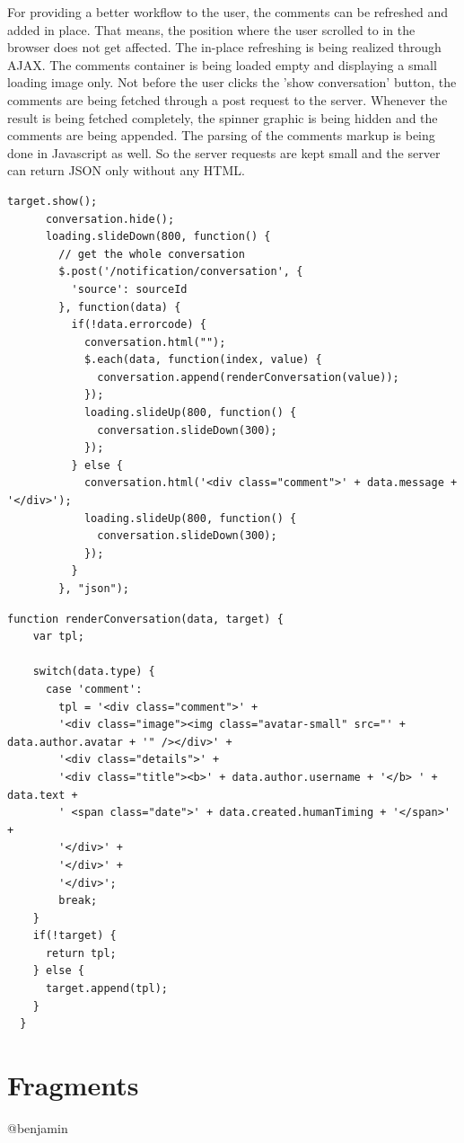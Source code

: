 For providing a better workflow to the user, the comments can be refreshed and added in place. That means, the position where the user scrolled to in the browser does not get affected. The in-place refreshing is being realized through AJAX. The comments container is being loaded empty and displaying a small loading image only. Not before the user clicks the 'show conversation' button, the comments are being fetched through a post request to the server. Whenever the result is being fetched completely, the spinner graphic is being hidden and the comments are being appended. The parsing of the comments markup is being done in Javascript as well. So the server requests are kept small and the server can return JSON only without any HTML.

\begin{lstlisting}[caption=Refreshing the comments of a resource]
	target.show();
      conversation.hide();
      loading.slideDown(800, function() {
        // get the whole conversation
        $.post('/notification/conversation', {
          'source': sourceId
        }, function(data) {
          if(!data.errorcode) {
            conversation.html("");
            $.each(data, function(index, value) {
              conversation.append(renderConversation(value));
            });
            loading.slideUp(800, function() {
              conversation.slideDown(300);
            });
          } else {
            conversation.html('<div class="comment">' + data.message + '</div>');
            loading.slideUp(800, function() {
              conversation.slideDown(300);
            });
          }
        }, "json");
\end{lstlisting}

\begin{lstlisting}[caption=Creating the markup of a single comment]
function renderConversation(data, target) {
    var tpl;
    
    switch(data.type) {
      case 'comment':
        tpl = '<div class="comment">' +
        '<div class="image"><img class="avatar-small" src="' + data.author.avatar + '" /></div>' +
        '<div class="details">' +
        '<div class="title"><b>' + data.author.username + '</b> ' + data.text + 
        ' <span class="date">' + data.created.humanTiming + '</span>' +
        '</div>' +
        '</div>' +
        '</div>';
        break;
    }
    if(!target) {
      return tpl;
    } else {
      target.append(tpl);
    }
  }
\end{lstlisting}

\section{Fragments}
@benjamin

